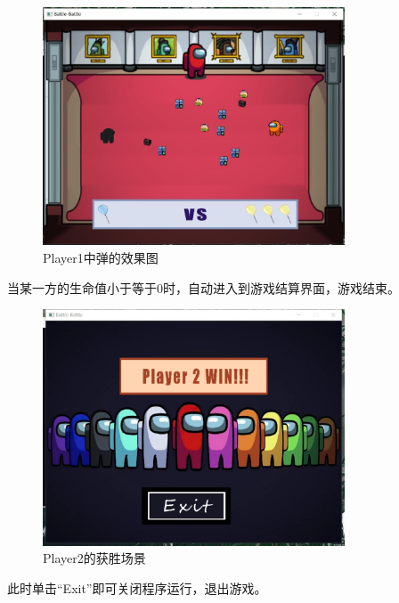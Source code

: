 \begin{figure}[htbp]
    \vspace{13pt} %
    \centering
    \includegraphics[width=0.8\textwidth]{images/4-13.jpg}
    \caption{Player1中弹的效果图}%
\end{figure}
\par
当某一方的生命值小于等于0时，自动进入到游戏结算界面，游戏结束。
\par
\begin{figure}[htbp]
    \vspace{13pt} %
    \centering
    \includegraphics[width=0.8\textwidth]{images/4-14.jpg}
    \caption{Player2的获胜场景}%
\end{figure}
\par
此时单击“Exit”即可关闭程序运行，退出游戏。

